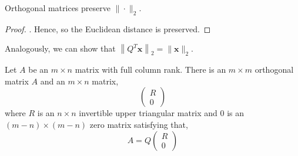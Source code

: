 \begin{rmk}
	Orthogonal matrices preserve $\|\cdot\|_2$. 
\end{rmk}

\begin{proof}
	. Hence,  so the Euclidean distance is preserved.
\end{proof}

\begin{rmk}
	Analogously, we can show that $\left\|Q^T \boldsymbol{x}\right\|_2=\|\boldsymbol{x}\|_2$.
\end{rmk}

\begin{defn}[QR Decomposition]
	Let $A$ be an $m \times n$ matrix with full column rank. There is an $m \times m$ orthogonal matrix $A$ and an $m \times n$ matrix,
	\[\left(\begin{array}{c}R \\ 0\end{array}\right)\]
	where $R$ is an $n \times n$ invertible upper triangular matrix and $0$ is an $(m-n) \times (m - n)$ zero matrix satisfying that,
	\[A = Q \left(\begin{array}{c}R \\ 0\end{array}\right)\]
\end{defn}

